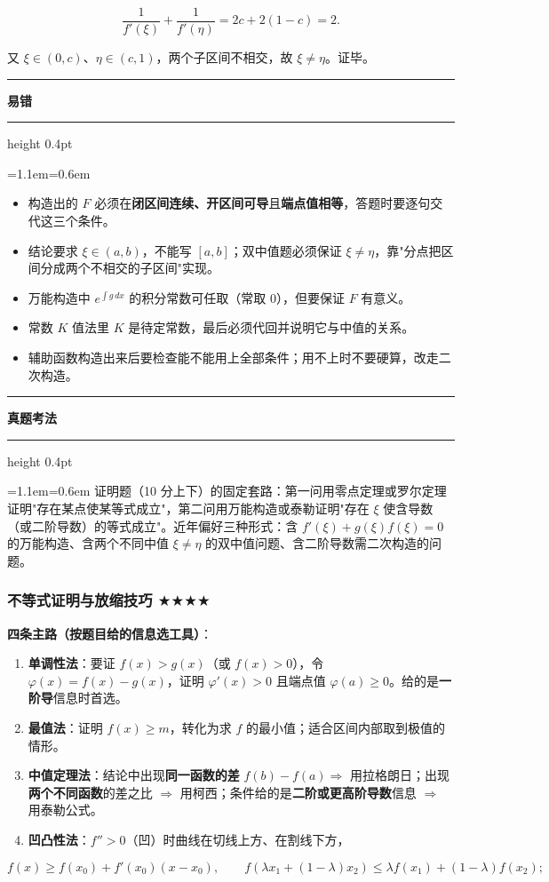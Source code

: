 \documentclass[11pt,openany,UTF8]{ctexbook}
\newcommand{\callouthead}[2]{%
  \par\addvspace{7pt}\noindent
  {\color{#1}\rule[-0.15em]{3pt}{1.05em}}\hspace{0.5em}%
  {\bfseries\color{#1}#2}\par\nobreak\vspace{-0.35em}%
  {\color{rulesep}\hrule height 0.4pt}\nobreak\vspace{0.45em}%
  \begingroup\small\setlength{\parindent}{0pt}%
  \leftskip=1.1em\rightskip=0.6em\noindent\ignorespaces}
\newcommand{\calloutend}{\par\endgroup\addvspace{7pt}}
\newenvironment{callwarn}[1]{\callouthead{warnbar}{#1}}{\calloutend}
\newenvironment{callexam}[1]{\callouthead{exambar}{#1}}{\calloutend}
\begin{document}
\[\frac{1}{f'(\xi)}+\frac{1}{f'(\eta)}=2c+2(1-c)=2 .\]

又 $\xi\in(0,c)$、$\eta\in(c,1)$，两个子区间不相交，故 $\xi\ne\eta$。证毕。

\begin{callwarn}{易错}
\begin{itemize}
\item 构造出的 $F$ 必须在\textbf{闭区间连续、开区间可导}且\textbf{端点值相等}，答题时要逐句交代这三个条件。
\item 结论要求 $\xi\in(a,b)$，不能写 $[a,b]$；双中值题必须保证 $\xi\ne\eta$，靠"分点把区间分成两个不相交的子区间"实现。
\item 万能构造中 $e^{\int g\,dx}$ 的积分常数可任取（常取 0），但要保证 $F$ 有意义。
\item 常数 $K$ 值法里 $K$ 是待定常数，最后必须代回并说明它与中值的关系。
\item 辅助函数构造出来后要检查能不能用上全部条件；用不上时不要硬算，改走二次构造。
\end{itemize}
\end{callwarn}

\begin{callexam}{真题考法}
证明题（10 分上下）的固定套路：第一问用零点定理或罗尔定理证明"存在某点使某等式成立"，第二问用万能构造或泰勒证明"存在 $\xi$ 使含导数（或二阶导数）的等式成立"。近年偏好三种形式：含 $f'(\xi)+g(\xi)f(\xi)=0$ 的万能构造、含两个不同中值 $\xi\ne\eta$ 的双中值问题、含二阶导数需二次构造的问题。

\end{callexam}

\subsubsection{不等式证明与放缩技巧 $\bigstar$$\bigstar$$\bigstar$$\bigstar$}

\textbf{四条主路（按题目给的信息选工具）}：

\begin{enumerate}
\item \textbf{单调性法}：要证 $f(x)>g(x)$（或 $f(x)>0$），令 $\varphi(x)=f(x)-g(x)$，证明 $\varphi'(x)>0$ 且端点值 $\varphi(a)\ge0$。给的是\textbf{一阶导}信息时首选。
\item \textbf{最值法}：证明 $f(x)\ge m$，转化为求 $f$ 的最小值；适合区间内部取到极值的情形。
\item \textbf{中值定理法}：结论中出现\textbf{同一函数的差} $f(b)-f(a)\Rightarrow$ 用拉格朗日；出现\textbf{两个不同函数}的差之比 $\Rightarrow$ 用柯西；条件给的是\textbf{二阶或更高阶导数}信息 $\Rightarrow$ 用泰勒公式。
\item \textbf{凹凸性法}：$f''>0$（凹）时曲线在切线上方、在割线下方，
\end{enumerate}
\[f(x)\ge f(x_0)+f'(x_0)(x-x_0),\qquad
f(\lambda x_1+(1-\lambda)x_2)\le\lambda f(x_1)+(1-\lambda)f(x_2);\]
\end{document}
